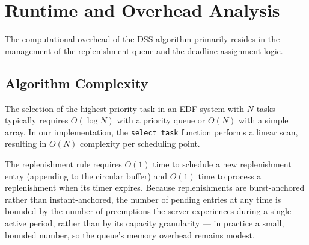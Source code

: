 \documentclass[conference]{IEEEtran}
\begin{document}
%

    \section{Runtime and Overhead Analysis}
    \label{sec:overhead}

    The computational overhead of the DSS algorithm primarily resides in the management of the replenishment queue and the deadline assignment logic.

    \subsection{Algorithm Complexity}
    The selection of the highest-priority task in an EDF system with $N$ tasks typically requires $O(\log N)$ with a priority queue or $O(N)$ with a simple array. In our implementation, the \texttt{select\_task} function performs a linear scan, resulting in $O(N)$ complexity per scheduling point.

    The replenishment rule requires $O(1)$ time to schedule a new replenishment entry (appending to the circular buffer) and $O(1)$ time to process a replenishment when its timer expires. Because replenishments are burst-anchored rather than instant-anchored, the number of pending entries at any time is bounded by the number of preemptions the server experiences during a single active period, rather than by its capacity granularity — in practice a small, bounded number, so the queue's memory overhead remains modest.
\end{document}
